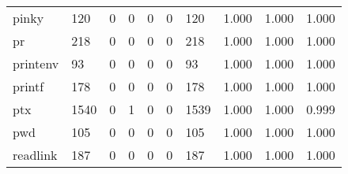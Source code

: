 \begin{longtable}{lp{1.3cm}p{1.3cm}p{1.3cm}p{1.3cm}p{1.3cm}p{1.3cm}p{1.3cm}p{1.3cm}p{1.3cm}}
pinky     &                    120 &                                  0 &                                 0 &                                0 &                                 0 &                             120 &                                1.000 &                                  1.000 &                                1.000 \\
pr        &                    218 &                                  0 &                                 0 &                                0 &                                 0 &                             218 &                                1.000 &                                  1.000 &                                1.000 \\
printenv  &                     93 &                                  0 &                                 0 &                                0 &                                 0 &                              93 &                                1.000 &                                  1.000 &                                1.000 \\
printf    &                    178 &                                  0 &                                 0 &                                0 &                                 0 &                             178 &                                1.000 &                                  1.000 &                                1.000 \\
ptx       &                   1540 &                                  0 &                                 1 &                                0 &                                 0 &                            1539 &                                1.000 &                                  1.000 &                                0.999 \\
pwd       &                    105 &                                  0 &                                 0 &                                0 &                                 0 &                             105 &                                1.000 &                                  1.000 &                                1.000 \\
readlink  &                    187 &                                  0 &                                 0 &                                0 &                                 0 &                             187 &                                1.000 &                                  1.000 &                                1.000 \\

\end{longtable}
